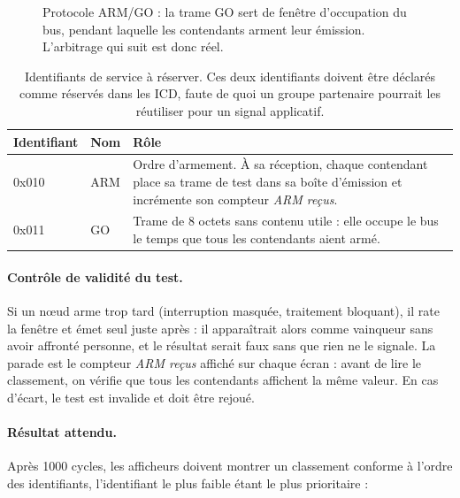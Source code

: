 \documentclass[11pt,a4paper]{article}
\begin{document}
\begin{figure}[H]
\caption{Protocole ARM/GO : la trame GO sert de fenêtre d'occupation du bus, pendant laquelle
les contendants arment leur émission. L'arbitrage qui suit est donc réel.}
\label{fig:armgo}
\end{figure}

\begin{table}[H]
\centering\small
\begin{tabular}{llp{8.4cm}}
\toprule
\textbf{Identifiant} & \textbf{Nom} & \textbf{Rôle} \\
\midrule
0x010 & ARM & Ordre d'armement. À sa réception, chaque contendant place sa trame de test dans
sa boîte d'émission et incrémente son compteur \emph{ARM reçus}. \\
0x011 & GO & Trame de \num{8} octets sans contenu utile : elle occupe le bus le temps que tous
les contendants aient armé. \\
\bottomrule
\end{tabular}
\caption{Identifiants de service à réserver. Ces deux identifiants doivent être déclarés comme
réservés dans les ICD, faute de quoi un groupe partenaire pourrait les réutiliser pour un
signal applicatif.}
\end{table}

\paragraph{Contrôle de validité du test.} Si un nœud arme trop tard (interruption masquée,
traitement bloquant), il rate la fenêtre et émet seul juste après : il apparaîtrait alors
comme vainqueur sans avoir affronté personne, et le résultat serait faux sans que rien ne le
signale. La parade est le compteur \emph{ARM reçus} affiché sur chaque écran : avant de lire
le classement, on vérifie que tous les contendants affichent la même valeur. En cas d'écart,
le test est invalide et doit être rejoué.

\paragraph{Résultat attendu.} Après \num{1000} cycles, les afficheurs doivent montrer un
classement conforme à l'ordre des identifiants, l'identifiant le plus faible étant le plus
prioritaire :
\end{document}
